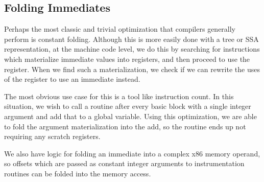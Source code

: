 \subsection{Folding Immediates}

Perhaps the most classic and trivial optimization that compilers generally
perform is constant folding.  Although this is more easily done with a tree or
SSA representation, at the machine code level, we do this by searching for
instructions which materialize immediate values into registers, and then proceed
to use the register.  When we find such a materialization, we check if we can
rewrite the uses of the register to use an immediate instead.

The most obvious use case for this is a tool like instruction count.  In this
situation, we wish to call a routine after every basic block with a single
integer argument and add that to a global variable.  Using this optimization, we
are able to fold the argument materialization into the add, so the routine ends
up not requiring any scratch registers.

We also have logic for folding an immediate into a complex x86 memory operand,
so offsets which are passed as constant integer arguments to instrumentation
routines can be folded into the memory access.
